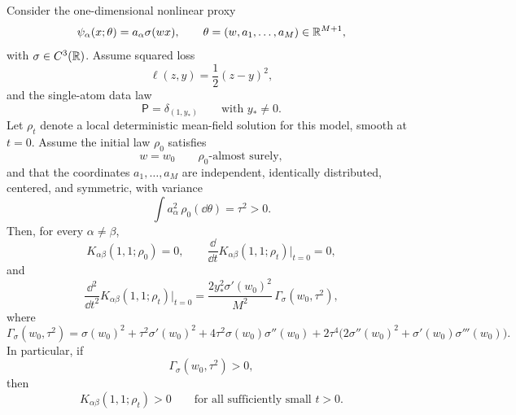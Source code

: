 \begin{proposition}
\label{prop:nonlinear-small-time}
Consider the one-dimensional nonlinear proxy
\begin{equation}
  \psi_\alpha(x;\theta)=a_\alpha \sigma(wx),
  \qquad
  \theta=(w,a_1,\dots,a_M)\in \mathbb{R}^{M+1},
  \label{eq:one-feature-proxy}
\end{equation}
with $\sigma \in C^3(\mathbb{R})$.
Assume squared loss
\[
  \ell(z,y)=\frac12 (z-y)^2,
\]
and the single-atom data law
\[
  \mathsf P=\delta_{(1,y_*)}
  \qquad
  \text{with } y_*\neq 0.
\]
Let $\rho_t$ denote a local deterministic mean-field solution for this model, smooth at $t=0$.
Assume the initial law $\rho_0$ satisfies
\[
  w=w_0
  \qquad
  \rho_0\text{-almost surely},
\]
and that the coordinates $a_1,\dots,a_M$ are independent, identically distributed, centered, and symmetric, with variance
\[
  \int a_\alpha^2\,\rho_0(\dd \theta)=\tau^2>0.
\]
Then, for every $\alpha\neq\beta$,
\[
  K_{\alpha\beta}(1,1;\rho_0)=0,
  \qquad
  \frac{\dd}{\dd t}K_{\alpha\beta}(1,1;\rho_t)\Big|_{t=0}=0,
\]
and
\begin{equation}
  \frac{\dd^2}{\dd t^2}K_{\alpha\beta}(1,1;\rho_t)\Big|_{t=0}
  =
  \frac{2y_*^2 \sigma'(w_0)^2}{M^2}\,
  \Gamma_\sigma(w_0,\tau^2),
  \label{eq:nonlinear-second}
\end{equation}
where
\begin{equation}
  \Gamma_\sigma(w_0,\tau^2)
  =
  \sigma(w_0)^2
  +
  \tau^2 \sigma'(w_0)^2
  +
  4\tau^2 \sigma(w_0)\sigma''(w_0)
  +
  2\tau^4
  \bigl(
    2\sigma''(w_0)^2+\sigma'(w_0)\sigma'''(w_0)
  \bigr).
  \label{eq:gamma-sigma}
\end{equation}
In particular, if
\[
  \Gamma_\sigma(w_0,\tau^2)>0,
\]
then
\[
  K_{\alpha\beta}(1,1;\rho_t)>0
  \qquad
  \text{for all sufficiently small }t>0.
\]
\end{proposition}

